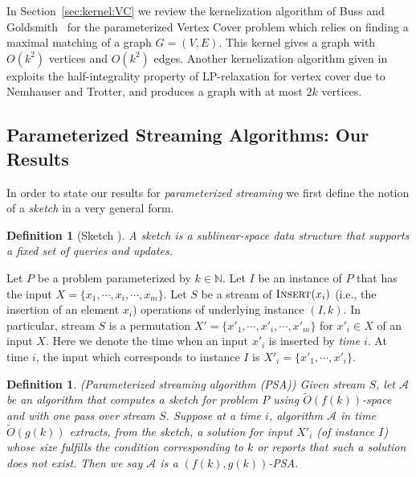 \documentclass[11pt,letter]{article}
\newtheorem{definition}[theorem]{Definition}
\renewcommand{\paragraph}[1]{\medskip \noindent {\bf #1}}
\newcommand{\NAT}{\ensuremath{\mathbb{N}}}
\newcommand{\NATURAL}{\NAT}
\begin{document}
In Section~\ref{sec:kernel:VC} we review
the kernelization algorithm of Buss and Goldsmith~\cite{BG93} for the parameterized Vertex Cover problem
which relies on finding a maximal matching of a graph $G=(V,E)$.
This kernel gives a graph with $O(k^2)$ vertices and $O(k^2)$ edges.
Another kernelization algorithm given in~\cite{FG06} exploits the half-integrality
property of LP-relaxation for vertex cover due to Nemhauser and Trotter,
and produces a graph with at most $2k$ vertices.




\subsection{Parameterized Streaming Algorithms: Our Results}

In order to state our results for \textit{parameterized streaming}
we first define the notion of a \textit{sketch}  in a very general form.


\begin{definition}[Sketch \cite{AMS99,FKSV02,I06JACM}]
\label{def:sketch}
A \it{sketch} is a sublinear-space data structure that supports
a fixed set of queries and updates.
\end{definition}




\paragraph{Insertion-Only Streaming.}
Let  $P$ be a problem parameterized by $k\in \NATURAL$.
Let $I$ be an instance of $P$ that has the input
$X=\{x_1,\cdots,x_i,\cdots, x_m\}$.
Let $S$ be a stream of $\textsc{Insert}(x_i)$ (i.e., the insertion of an element $x_i$)
operations of underlying instance $(I,k)$.
In particular, stream $S$ is a permutation
$X'=\{x'_1,\cdots,x'_i,\cdots, x'_m\}$ for $x'_i\in X$ of an input $X$. Here we denote
the time when an input $x'_i$ is inserted by \textit{time} $i$. At time $i$,
the input which corresponds to instance $I$ is $X'_i=\{x'_1,\cdots,x'_i\}$.



\begin{definition}({\sc Parameterized streaming algorithm (PSA)})
Given stream $S$, let  $\mathcal{A}$ be an algorithm  that computes a sketch for problem $P$
using $\tilde{O}(f(k))$-space
and with one pass over stream $S$. Suppose at a time $i$,
algorithm $\mathcal{A}$ in time $\tilde{O}(g(k))$ extracts,  from the sketch,
a solution for input $X'_i$ (of instance $I$) whose  size fulfills
the condition corresponding to $k$  or reports that such a solution does not exist.
Then we say $\mathcal{A}$ is a $(f(k), g(k))$-PSA.
\label{defn:psa}
\end{definition}
\end{document}

